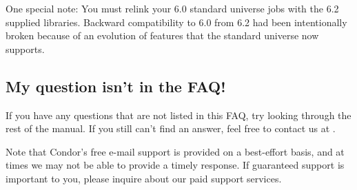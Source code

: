 One special note: You must relink your 6.0 standard universe jobs with
the 6.2 supplied libraries. Backward compatibility to 6.0 from 6.2 had
been intentionally broken because of an evolution of features that the
standard universe now supports.

\subsection*{My question isn't in the FAQ!}

If you have any questions that are not listed in this FAQ, try looking
through the rest of the manual.
If you still can't find an answer, feel free to contact us at
.

Note that Condor's free e-mail support is provided on a best-effort
basis, and at times we may not be able to provide a timely response.
If guaranteed support is important to you, please inquire about our
paid support services.



